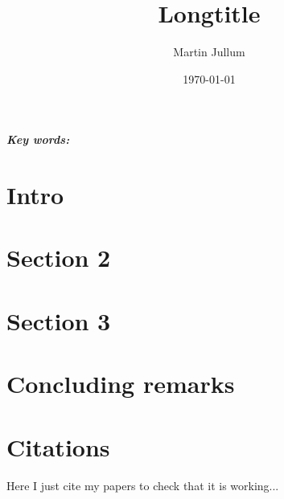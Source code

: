 \documentclass[a4paper,english,11pt,reqno,oneside]{amsart}
\title[Shorttitle]{Longtitle}
\date{\today}
\author{Martin Jullum}
\providecommand{\keywords}[1]{\textbf{\textit{Key words:}} #1}
\theoremstyle{theorem}
\numberwithin{equation}{section}
\numberwithin{figure}{section}
\numberwithin{table}{section}
\begin{document}
\begin{abstract}
\lipsum[10]
\end{abstract}


\maketitle
 
\keywords{}

\section{Intro}
\label{sec:Intro}
\lipsum


\section{Section 2}
\label{sec:Sec2}
\lipsum


\section{Section 3}
\label{sec:Sec3}

\lipsum

\section{Concluding remarks}
\label{sec:ConcludingRemarks}
\lipsum


\appendix 

\section{Citations}
\label{sec:Appendix}
Here I just cite my papers to check that it is working...
\citet{MJ_FICnp16}
\citet{MJ_CoxFIC16}
\citet{MJ_TimeSeriesFIC16}
\citet{MJ_ApproxBayes16}
\citet{MJ_LeadingEdge16}
\citet{MJ_TimeSeriesFICRio15}
\citet{MJ_EAPetroleum_Geostat2015}





\end{document}
